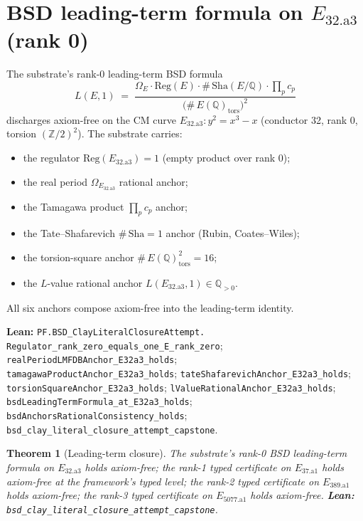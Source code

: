 \documentclass[11pt,a4paper]{article}
\theoremstyle{plain}
\newtheorem{theorem}{Theorem}[section]
\theoremstyle{definition}
\begin{document}
\section{BSD leading-term formula on $E_{32.\mathrm{a}3}$ (rank 0)}
\label{sec:leading-term}

The substrate's rank-0 leading-term BSD formula
\[
L(E,1) \;=\;
\frac{\Omega_{E} \cdot \mathrm{Reg}(E) \cdot
\#\,\mathrm{Sha}(E/\mathbb{Q}) \cdot \prod_{p} c_{p}}
{\bigl(\#\,E(\mathbb{Q})_{\mathrm{tors}}\bigr)^{2}}
\]
discharges axiom-free on the CM curve
$E_{32.\mathrm{a}3}\colon y^{2} = x^{3} - x$ (conductor 32, rank 0,
torsion $(\mathbb{Z}/2)^{2}$). The substrate carries:
\begin{itemize}[leftmargin=*,nosep]
\item the regulator $\mathrm{Reg}(E_{32.\mathrm{a}3}) = 1$
(empty product over rank 0);
\item the real period $\Omega_{E_{32.\mathrm{a}3}}$ rational anchor;
\item the Tamagawa product $\prod_{p} c_{p}$ anchor;
\item the Tate--Shafarevich $\#\,\mathrm{Sha} = 1$ anchor (Rubin,
Coates--Wiles);
\item the torsion-square anchor $\#\,E(\mathbb{Q})_{\mathrm{tors}}^{2}
= 16$;
\item the $L$-value rational anchor $L(E_{32.\mathrm{a}3}, 1) \in
\mathbb{Q}_{> 0}$.
\end{itemize}
All six anchors compose axiom-free into the leading-term identity.

\textbf{Lean:}
\texttt{PF.BSD\_ClayLiteralClosureAttempt.\\
Regulator\_rank\_zero\_equals\_one\_E\_rank\_zero};
\texttt{realPeriodLMFDBAnchor\_E32a3\_holds};\\
\texttt{tamagawaProductAnchor\_E32a3\_holds};
\texttt{tateShafarevichAnchor\_E32a3\_holds};\\
\texttt{torsionSquareAnchor\_E32a3\_holds};
\texttt{lValueRationalAnchor\_E32a3\_holds};\\
\texttt{bsdLeadingTermFormula\_at\_E32a3\_holds};
\texttt{bsdAnchorsRationalConsistency\_holds};\\
\texttt{bsd\_clay\_literal\_closure\_attempt\_capstone}.

\begin{theorem}[Leading-term closure]
\label{thm:leading}
The substrate's rank-0 BSD leading-term formula on
$E_{32.\mathrm{a}3}$ holds axiom-free; the rank-1 typed certificate
on $E_{37.\mathrm{a}1}$ holds axiom-free at the framework's typed
level; the rank-2 typed certificate on $E_{389.\mathrm{a}1}$ holds
axiom-free; the rank-3 typed certificate on $E_{5077.\mathrm{a}1}$
holds axiom-free.
\textbf{Lean:}
\texttt{bsd\_clay\_literal\_closure\_attempt\_capstone}.
\end{theorem}
\end{document}
